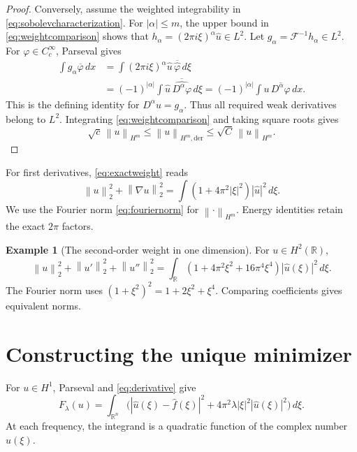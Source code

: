 \documentclass[11pt]{article}
\numberwithin{equation}{section}
\theoremstyle{definition}
\newtheorem{example}[theorem]{Example}
\theoremstyle{remark}
\newcommand{\R}{\mathbb R}
\newcommand{\F}{\mathcal F}
\newcommand{\dd}{\,d}
\newcommand{\norm}[1]{\left\|#1\right\|}
\newcommand{\wh}[1]{\widehat{#1}}
\begin{document}
\begin{proof}
Conversely, assume the weighted integrability in \eqref{eq:sobolevcharacterization}. For \(|\alpha|\le m\), the upper bound in \eqref{eq:weightcomparison} shows that
\(h_\alpha=(2\pi i\xi)^\alpha\wh u\in L^2\). Let
\(g_\alpha=\F^{-1}h_\alpha\in L^2\). For \(\varphi\in C_c^\infty\), Parseval gives
\begin{align*}
 \int g_\alpha\overline\varphi\dd x
 &=\int(2\pi i\xi)^\alpha\wh u\,\overline{\wh\varphi}\dd\xi\\
 &=(-1)^{|\alpha|}\int\wh u\,
                   \overline{\wh{D^\alpha\varphi}}\dd\xi
 =(-1)^{|\alpha|}\int u\,\overline{D^\alpha\varphi}\dd x.
\end{align*}
This is the defining identity for \(D^\alpha u=g_\alpha\). Thus all required weak derivatives belong to \(L^2\). Integrating \eqref{eq:weightcomparison} and taking square roots gives
\[
 \sqrt c\,\norm u_{H^m}\le\norm u_{H^m,\mathrm{der}}
                         \le\sqrt C\,\norm u_{H^m}.
\]
\end{proof}

For first derivatives, \eqref{eq:exactweight} reads
\begin{equation}\label{eq:h1exact}
 \norm u_2^2+\norm{\nabla u}_2^2
       =\int(1+4\pi^2|\xi|^2)|\wh u|^2\dd\xi.
\end{equation}
We use the Fourier norm \eqref{eq:fouriernorm} for \(\norm{\cdot}_{H^m}\). Energy identities retain the exact \(2\pi\) factors.

\begin{example}[The second-order weight in one dimension]
For \(u\in H^2(\R)\),
\[
 \norm u_2^2+\norm{u'}_2^2+\norm{u''}_2^2
  =\int_{\R}(1+4\pi^2\xi^2+16\pi^4\xi^4)|\wh u(\xi)|^2\dd\xi.
\]
The Fourier norm uses \((1+\xi^2)^2=1+2\xi^2+\xi^4\). Comparing coefficients gives equivalent norms.
\end{example}

\section{Constructing the unique minimizer}\label{sec:minimizer}
For \(u\in H^1\), Parseval and \eqref{eq:derivative} give
\begin{equation}\label{eq:fourierenergy}
 F_\lambda(u)=\int_{\R^n}
  \bigl(|\wh u(\xi)-\wh f(\xi)|^2
      +4\pi^2\lambda|\xi|^2|\wh u(\xi)|^2\bigr)\dd\xi.
\end{equation}
At each frequency, the integrand is a quadratic function of the complex number \(\wh u(\xi)\).
\end{document}
